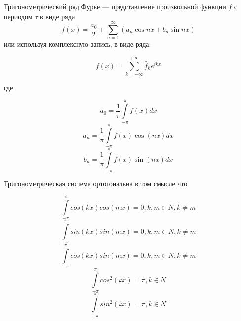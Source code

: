 Тригонометрический ряд Фурье — представление произвольной функции $f$ с периодом $\tau$  в виде ряда
$$f(x)=\frac{a_0}{2} + \sum^{\infty}_{n=1} (a_n \cos nx + b_n \sin nx)$$
или используя комплексную запись, в виде ряда:

$$f(x) = \sum\limits_{k=-\infty}^{+\infty} \hat{f}_k e^{ikx}$$

где

$$a_0= \frac{1}{\pi}\int\limits_{-\pi}^{\pi}f(x)dx$$
$$a_n= \frac{1}{\pi}\int\limits_{-\pi}^{\pi}f(x)\cos(nx)dx$$
$$b_n= \frac{1}{\pi}\int\limits_{-\pi}^{\pi}f(x)\sin(nx)dx$$


Тригонометрическая система ортогональна в том смысле что

$$\int\limits_{-\pi}^{\pi}cos(kx)cos(mx)=0, k,m \in N, k\ne m$$
$$\int\limits_{-\pi}^{\pi}sin(kx)sin(mx)=0, k,m \in N, k\ne m$$
$$\int\limits_{-\pi}^{\pi}cos(kx)sin(mx)=0, k,m \in N, k\ne m$$
$$\int\limits_{-\pi}^{\pi}cos^2(kx)=\pi, k \in N$$
$$\int\limits_{-\pi}^{\pi}sin^2(kx)=\pi, k \in N$$


